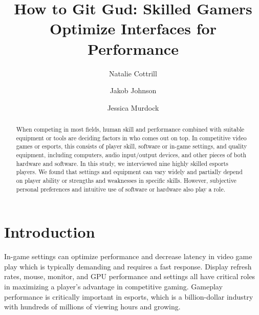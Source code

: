 \documentclass[sigconf]{acmart}
\begin{document}
\title{How to Git Gud: Skilled Gamers Optimize Interfaces for Performance}

\author{Natalie Cottrill}

\author{Jakob Johnson}

\author{Jessica Murdock}

\begin{abstract}
    When competing in most fields, human skill and performance combined with suitable equipment or tools are deciding factors in who comes out on top. In competitive video games or esports, this consists of player skill, software or in-game settings, and quality equipment, including computers, audio input/output devices, and other pieces of both hardware and software. In this study, we interviewed nine highly skilled esports players. We found that settings and equipment can vary widely and partially depend on player ability or strengths and weaknesses in specific skills. However, subjective personal preferences and intuitive use of software or hardware also play a role.
\end{abstract}


\maketitle

\section{Introduction}
In-game settings can optimize performance and decrease latency in video game play \cite{Liu2021} which is typically demanding and requires a fast response. Display refresh rates, mouse, monitor, and GPU performance and settings all have critical roles in maximizing a player's advantage in competitive gaming. Gameplay performance is critically important in esports, which is a billion-dollar industry \cite{ayles2019} with hundreds of millions of viewing hours and growing. 
\end{document}
